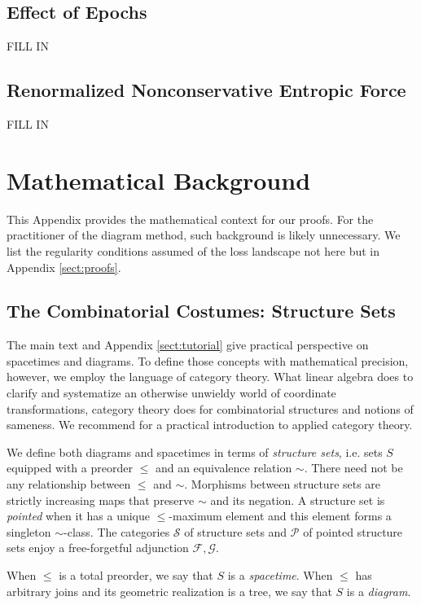 \documentclass{article}
\newcommand{\Free}{\mathcal{F}}
\newcommand{\Forg}{\mathcal{G}}
\newcommand{\Pp}{\mathcal{P}}
\newcommand{\Ss}{\mathcal{S}}
\begin{document}
    \subsection{Effect of Epochs}
        {\color{moor} FILL IN}
    \subsection{Renormalized Nonconservative Entropic Force}
        {\color{moor} FILL IN}



\section{Mathematical Background} \label{sect:morebackground}
    This Appendix provides the mathematical context for our proofs.  For the
    practitioner of the diagram method, such background is likely unnecessary.
    We list the regularity conditions assumed of the loss landscape not here
    but in Appendix \ref{sect:proofs}.

    \subsection{The Combinatorial Costumes: Structure Sets}
        The main text and Appendix \ref{sect:tutorial} give practical
        perspective on spacetimes and diagrams.  To define those concepts with
        mathematical precision, however, we employ the language of category
        theory.  What linear algebra does to clarify and systematize an
        otherwise unwieldy world of coordinate transformations, category theory
        does for combinatorial structures and notions of sameness.  We
        recommend \citet{fo19} for a practical introduction to applied category
        theory.

        We define both diagrams and spacetimes in terms of \emph{structure
        sets}, i.e. sets $S$ equipped with a preorder $\leq$ and an equivalence
        relation $\sim$.  There need not be any relationship between $\leq$ and
        $\sim$.  Morphisms between structure sets are strictly increasing maps
        that preserve $\sim$ and its negation.  A structure set is
        \emph{pointed} when it has a unique $\leq$-maximum element and this
        element forms a singleton $\sim$-class.  The categories $\Ss$ of
        structure sets and $\Pp$ of pointed structure sets enjoy a
        free-forgetful adjunction $\Free, \Forg$.
        
        When $\leq$ is a total preorder, we say that $S$ is a \emph{spacetime}.
        When $\leq$ has arbitrary joins and its geometric realization is a
        tree, we say that $S$ is a \emph{diagram}. 
        
\end{document}
